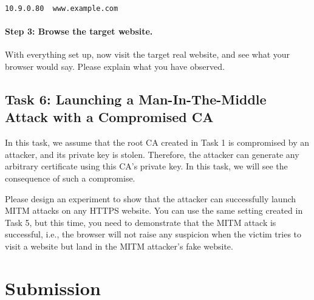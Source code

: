 \begin{lstlisting}
10.9.0.80  www.example.com
\end{lstlisting}


\paragraph{Step 3: Browse the target website.}
With everything set up, now visit the target real website, and 
see what your browser would say. Please explain what you have observed. 




\subsection{Task 6: Launching a Man-In-The-Middle Attack with a Compromised CA}

In this task, we assume that the root CA created in Task 1 is compromised by an attacker, 
and its private key is stolen. Therefore, the attacker can generate any arbitrary certificate 
using this CA's private key. In this task, we will see 
the consequence of such a compromise. 


Please design an experiment to show that the attacker can successfully launch MITM attacks on
any HTTPS website. You can use the same setting created in Task 5, but this time, you need to
demonstrate that the MITM attack is successful, i.e., the browser will not 
raise any suspicion when the victim tries to visit a website but land in the MITM attacker's
fake website.



\section{Submission}







